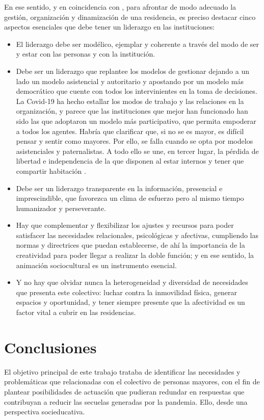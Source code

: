 \documentclass{textolivre}
\begin{document}
En ese sentido, y en coincidencia con \textcite{bermejo2020}, %
para afrontar de modo adecuado la gestión, organización y dinamización de una residencia, es preciso destacar cinco aspectos esenciales que debe tener un liderazgo en las instituciones:

\begin{itemize}
    \item El liderazgo debe ser modélico, ejemplar y coherente a través del modo de ser y estar con las personas y con la institución.
    \item Debe ser un liderazgo que replantee los modelos de gestionar dejando a un lado un modelo asistencial y autoritario y apostando por un modelo más democrático que cuente con todos los intervinientes en la toma de decisiones. La Covid-19 ha hecho estallar los modos de trabajo y las relaciones en la organización, y parece que las instituciones que mejor han funcionado han sido las que adoptaron un modelo más participativo, que permita empoderar a todos los agentes. Habría que clarificar que, si no se es mayor, es difícil pensar y sentir como mayores. Por ello, se falla cuando se opta por modelos asistenciales y paternalistas. A todo ello se une, en tercer lugar, la pérdida de libertad e independencia de la que disponen al estar internos y tener que compartir habitación \cite{martinezdemiguel2009}. %
    
    \item Debe ser un liderazgo transparente en la información, presencial e imprescindible, que favorezca un clima de esfuerzo pero al mismo tiempo humanizador y perseverante.
    \item Hay que complementar y flexibilizar los ajustes y recursos para poder satisfacer las necesidades relacionales, psicológicas y afectivas, cumpliendo las normas y directrices que puedan establecerse, de ahí la importancia de la creatividad para poder llegar a realizar la doble función; y en ese sentido, la animación sociocultural es un instrumento esencial.
    \item Y no hay que olvidar nunca la heterogeneidad y diversidad de necesidades que presenta este colectivo: luchar contra la inmovilidad física, generar espacios y oportunidad, y tener siempre presente que la afectividad es un factor vital a cubrir en las residencias.
\end{itemize}

\section{Conclusiones}
El objetivo principal de este trabajo trataba de identificar las necesidades y problemáticas que relacionadas con el colectivo de personas mayores, con el fin de plantear posibilidades de actuación que pudieran redundar en respuestas que contribuyan a reducir las secuelas generadas por la pandemia. Ello, desde una perspectiva socieducativa.
\end{document}
